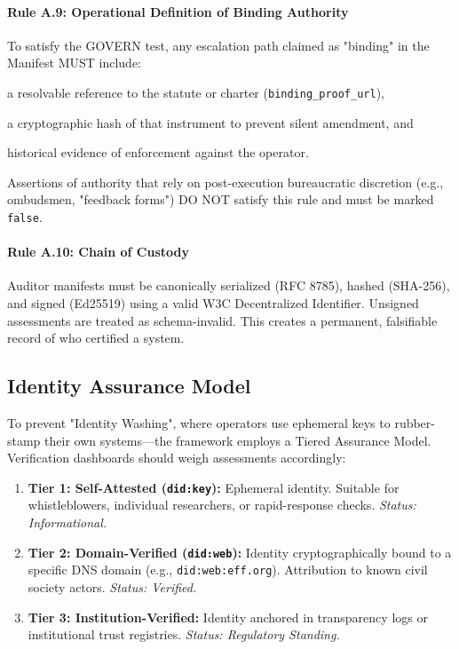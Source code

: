 \paragraph{Rule A.9: Operational Definition of Binding Authority}
To satisfy the GOVERN test, any escalation path claimed as "binding" in the Manifest MUST include:
\begin{enumerate*}[label=(\roman*)]
    \item a resolvable reference to the statute or charter (\texttt{binding\_proof\_url}),
    \item a cryptographic hash of that instrument to prevent silent amendment, and
    \item historical evidence of enforcement against the operator.
\end{enumerate*}
Assertions of authority that rely on post-execution bureaucratic discretion (e.g., ombudsmen, "feedback forms") DO NOT satisfy this rule and must be marked \texttt{false}.

\paragraph{Rule A.10: Chain of Custody}
Auditor manifests must be canonically serialized (RFC 8785), hashed (SHA-256), and signed (Ed25519) using a valid W3C Decentralized Identifier. Unsigned assessments are treated as schema-invalid. This creates a permanent, falsifiable record of who certified a system.

\subsection{Identity Assurance Model}

To prevent "Identity Washing", where operators use ephemeral keys to rubber-stamp their own systems---the framework employs a Tiered Assurance Model. Verification dashboards should weigh assessments accordingly:

\begin{enumerate}
    \item \textbf{Tier 1: Self-Attested (\texttt{did:key}):} Ephemeral identity. Suitable for whistleblowers, individual researchers, or rapid-response checks. \textit{Status: Informational.}
    \item \textbf{Tier 2: Domain-Verified (\texttt{did:web}):} Identity cryptographically bound to a specific DNS domain (e.g., \texttt{did:web:eff.org}). Attribution to known civil society actors. \textit{Status: Verified.}
    \item \textbf{Tier 3: Institution-Verified:} Identity anchored in transparency logs or institutional trust registries. \textit{Status: Regulatory Standing.}
\end{enumerate}


